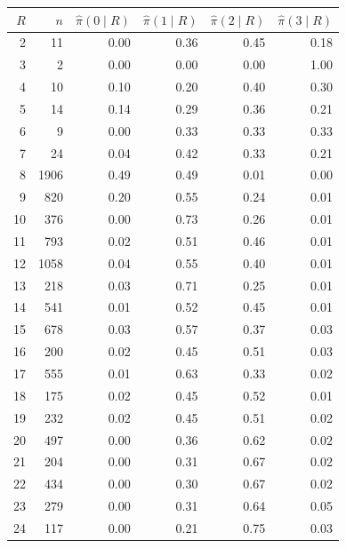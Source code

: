 \begin{tabular}{rrrrrr}
\toprule
$R$ & $n$ & $\hat\pi(0\mid R)$ & $\hat\pi(1\mid R)$ & $\hat\pi(2\mid R)$ & $\hat\pi(3\mid R)$ \\
\midrule
2 & 11 & 0.00 & 0.36 & 0.45 & 0.18 \\
3 & 2 & 0.00 & 0.00 & 0.00 & 1.00 \\
4 & 10 & 0.10 & 0.20 & 0.40 & 0.30 \\
5 & 14 & 0.14 & 0.29 & 0.36 & 0.21 \\
6 & 9 & 0.00 & 0.33 & 0.33 & 0.33 \\
7 & 24 & 0.04 & 0.42 & 0.33 & 0.21 \\
8 & 1906 & 0.49 & 0.49 & 0.01 & 0.00 \\
9 & 820 & 0.20 & 0.55 & 0.24 & 0.01 \\
10 & 376 & 0.00 & 0.73 & 0.26 & 0.01 \\
11 & 793 & 0.02 & 0.51 & 0.46 & 0.01 \\
12 & 1058 & 0.04 & 0.55 & 0.40 & 0.01 \\
13 & 218 & 0.03 & 0.71 & 0.25 & 0.01 \\
14 & 541 & 0.01 & 0.52 & 0.45 & 0.01 \\
15 & 678 & 0.03 & 0.57 & 0.37 & 0.03 \\
16 & 200 & 0.02 & 0.45 & 0.51 & 0.03 \\
17 & 555 & 0.01 & 0.63 & 0.33 & 0.02 \\
18 & 175 & 0.02 & 0.45 & 0.52 & 0.01 \\
19 & 232 & 0.02 & 0.45 & 0.51 & 0.02 \\
20 & 497 & 0.00 & 0.36 & 0.62 & 0.02 \\
21 & 204 & 0.00 & 0.31 & 0.67 & 0.02 \\
22 & 434 & 0.00 & 0.30 & 0.67 & 0.02 \\
23 & 279 & 0.00 & 0.31 & 0.64 & 0.05 \\
24 & 117 & 0.00 & 0.21 & 0.75 & 0.03 \\
\bottomrule
\end{tabular}
